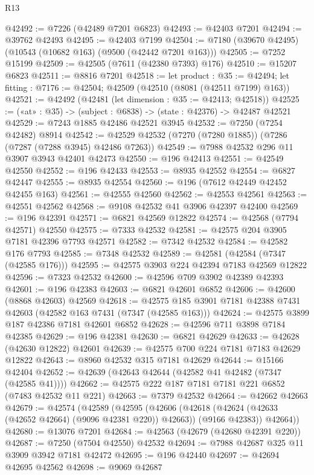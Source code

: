\begin{lexlean}{R13}
\begin{coremodule}
@42492 := @7226 (@42489 @7201 @6823)
@42493 := @42403 @7201
@42494 := @39762 @42493
@42495 := @42403 @7199
@42504 := @7180 (@39670 @42495) (@10543 (@10682 @163) (@9500 (@42442 @7201 @163)))
@42505 := @7252 @15199
@42509 := @42505 (@7611 (@42380 @7393) @176)
@42510 := @15207 @6823
@42511 := @8816 @7201
@42518 := let product : @35 := @42494;
  let fitting : @7176 := @42504; @42509 (@42510 (@8081 (@42511 @7199) @163))
@42521 := @42492 (@42481 (let dimension : @35 := @42413; @42518))
@42525 := («at» : @35) -> (subject : @6838) -> (state : @42376) -> @42487 @42521
@42529 := @7243 @1885 @42486 @42521 @3945
@42532 := @7250 (@7254 @42482) @8914
@42542 := @42529 @42532 (@7270 (@7280 @1885)) (@7286 (@7287 (@7288 @3945) @42486 @7263))
@42549 := @7988 @42532 @296 @11 @3907 @3943 @42401 @42473
@42550 := @196 @42413
@42551 := @42549 @42550
@42552 := @196 @42433
@42553 := @8935 @42552
@42554 := @6827 @42447
@42555 := @8935 @42554
@42560 := @196 (@7612 @42449 @42452 @42455 @163)
@42561 := @42555 @42560
@42562 := @42553 @42561
@42563 := @42551 @42562
@42568 := @9108 @42532 @41 @3906 @42397 @42400
@42569 := @196 @42391
@42571 := @6821 @42569 @12822
@42574 := @42568 (@7794 @42571) @42550
@42575 := @7333 @42532
@42581 := @42575 @204 @3905 @7181 @42396 @7793 @42571
@42582 := @7342 @42532
@42584 := @42582 @176 @7793
@42585 := @7348 @42532
@42589 := @42581 (@42584 (@7347 (@42585 @176)))
@42595 := @42575 @3903 @224 @42394 @7183 @42569 @12822
@42596 := @7323 @42532
@42600 := @42596 @709 @3902 @42389 @42393
@42601 := @196 @42383
@42603 := @6821 @42601 @6852
@42606 := @42600 (@8868 @42603) @42569
@42618 := @42575 @185 @3901 @7181 @42388 @7431 @42603 (@42582 @163 @7431 (@7347 (@42585 @163)))
@42624 := @42575 @3899 @187 @42386 @7181 @42601 @6852
@42628 := @42596 @711 @3898 @7184 @42385
@42629 := @196 @42381
@42630 := @6821 @42629
@42633 := @42628 (@42630 @12822) @42601
@42639 := @42575 @700 @224 @7181 @7183 @42629 @12822
@42643 := @8960 @42532 @315 @7181 @42629
@42644 := @15166 @42404
@42652 := @42639 (@42643 @42644 (@42582 @41 @42482 (@7347 (@42585 @41))))
@42662 := @42575 @222 @187 @7181 @7181 @221 @6852 (@7483 @42532 @11 @221)
@42663 := @7379 @42532
@42664 := @42662 @42663
@42679 := @42574
    (@42589
      (@42595
        (@42606
          (@42618 (@42624 (@42633 (@42652 @42664) (@9096 @42381 @220)) @42663))
          (@9166 @42383))
        @42664))
@42680 := @13076 @7201
@42684 := @42563 (@42679 (@42680 @42391 @220))
@42687 := @7250 (@7504 @42550) @42532
@42694 := @7988 @42687 @325 @11 @3909 @3942 @7181 @42472
@42695 := @196 @42440
@42697 := @42694 @42695 @42562
@42698 := @9069 @42687

\end{coremodule}
\end{lexlean}
